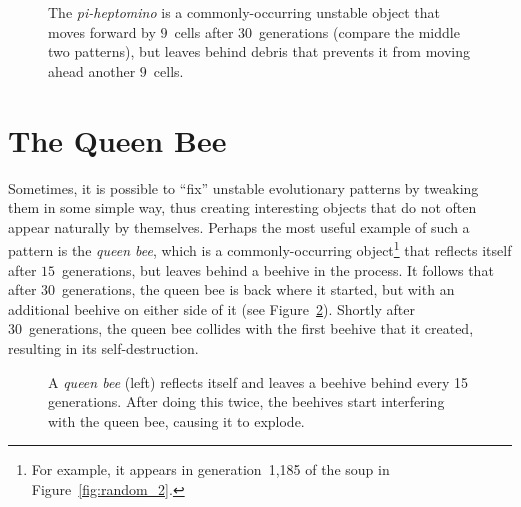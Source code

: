\begin{figure}[!htb]
	\centering
	\caption{The \emph{pi-heptomino} is a commonly-occurring unstable object that moves forward by $9$~cells after $30$~generations (compare the middle two patterns), but leaves behind debris that prevents it from moving ahead another $9$~cells.}\label{fig:pi_heptomino}
\end{figure}


\section{The Queen Bee}\label{sec:queen_bee}

Sometimes, it is possible to ``fix'' unstable evolutionary patterns by tweaking them in some simple way, thus creating interesting objects that do not often appear naturally by themselves. Perhaps the most useful example of such a pattern is the \emph{queen bee}, which is a commonly-occurring object\footnote{For example, it appears in generation~1,185 of the soup in Figure~\ref{fig:random_2}.} that reflects itself after $15$~generations, but leaves behind a beehive in the process. It follows that after 30~generations, the queen bee is back where it started, but with an additional beehive on either side of it (see Figure~\ref{fig:queen_bee}). Shortly after 30~generations, the queen bee collides with the first beehive that it created, resulting in its self-destruction.

\begin{figure}[!htb]
	\centering{}
	\caption{A \emph{queen bee} (left) reflects itself and leaves a beehive behind every 15 generations. After doing this twice, the beehives start interfering with the queen bee, causing it to explode.}\label{fig:queen_bee}
\end{figure}


